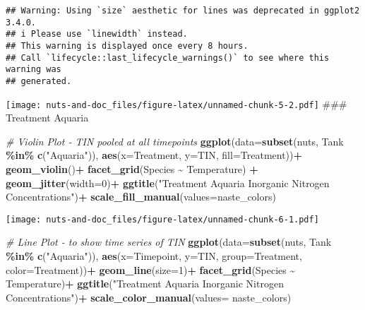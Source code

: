 \documentclass[
]{article}
\newenvironment{Shaded}{\begin{snugshade}}{\end{snugshade}}
\newcommand{\AttributeTok}[1]{\textcolor[rgb]{0.13,0.29,0.53}{#1}}
\newcommand{\CommentTok}[1]{\textcolor[rgb]{0.56,0.35,0.01}{\textit{#1}}}
\newcommand{\DecValTok}[1]{\textcolor[rgb]{0.00,0.00,0.81}{#1}}
\newcommand{\FunctionTok}[1]{\textcolor[rgb]{0.13,0.29,0.53}{\textbf{#1}}}
\newcommand{\NormalTok}[1]{#1}
\newcommand{\SpecialCharTok}[1]{\textcolor[rgb]{0.81,0.36,0.00}{\textbf{#1}}}
\newcommand{\StringTok}[1]{\textcolor[rgb]{0.31,0.60,0.02}{#1}}
\begin{document}
\begin{verbatim}
## Warning: Using `size` aesthetic for lines was deprecated in ggplot2 3.4.0.
## i Please use `linewidth` instead.
## This warning is displayed once every 8 hours.
## Call `lifecycle::last_lifecycle_warnings()` to see where this warning was
## generated.
\end{verbatim}

\texttt{[image: nuts-and-doc\_files/figure-latex/unnamed-chunk-5-2.pdf]}
\#\#\# Treatment Aquaria

\begin{Shaded}
\begin{Highlighting}[]
\CommentTok{\# Violin Plot {-} TIN pooled at all timepoints}
\FunctionTok{ggplot}\NormalTok{(}\AttributeTok{data=}\FunctionTok{subset}\NormalTok{(nuts, Tank }\SpecialCharTok{\%in\%} \FunctionTok{c}\NormalTok{(}\StringTok{"Aquaria"}\NormalTok{)), }\FunctionTok{aes}\NormalTok{(}\AttributeTok{x=}\NormalTok{Treatment, }\AttributeTok{y=}\NormalTok{TIN, }\AttributeTok{fill=}\NormalTok{Treatment))}\SpecialCharTok{+}
  \FunctionTok{geom\_violin}\NormalTok{()}\SpecialCharTok{+}
  \FunctionTok{facet\_grid}\NormalTok{(Species }\SpecialCharTok{\textasciitilde{}}\NormalTok{ Temperature) }\SpecialCharTok{+}
  \FunctionTok{geom\_jitter}\NormalTok{(}\AttributeTok{width=}\DecValTok{0}\NormalTok{)}\SpecialCharTok{+}
  \FunctionTok{ggtitle}\NormalTok{(}\StringTok{"Treatment Aquaria Inorganic Nitrogen Concentrations"}\NormalTok{)}\SpecialCharTok{+}
  \FunctionTok{scale\_fill\_manual}\NormalTok{(}\AttributeTok{values=}\NormalTok{naste\_colors)}
\end{Highlighting}
\end{Shaded}

\texttt{[image: nuts-and-doc\_files/figure-latex/unnamed-chunk-6-1.pdf]}

\begin{Shaded}
\begin{Highlighting}[]
\CommentTok{\# Line Plot {-} to show time series of TIN}
\FunctionTok{ggplot}\NormalTok{(}\AttributeTok{data=}\FunctionTok{subset}\NormalTok{(nuts, Tank }\SpecialCharTok{\%in\%} \FunctionTok{c}\NormalTok{(}\StringTok{"Aquaria"}\NormalTok{)), }\FunctionTok{aes}\NormalTok{(}\AttributeTok{x=}\NormalTok{Timepoint, }\AttributeTok{y=}\NormalTok{TIN, }\AttributeTok{group=}\NormalTok{Treatment, }\AttributeTok{color=}\NormalTok{Treatment))}\SpecialCharTok{+}
  \FunctionTok{geom\_line}\NormalTok{(}\AttributeTok{size=}\DecValTok{1}\NormalTok{)}\SpecialCharTok{+}
  \FunctionTok{facet\_grid}\NormalTok{(Species }\SpecialCharTok{\textasciitilde{}}\NormalTok{ Temperature)}\SpecialCharTok{+}
  \FunctionTok{ggtitle}\NormalTok{(}\StringTok{"Treatment Aquaria Inorganic Nitrogen Concentrations"}\NormalTok{)}\SpecialCharTok{+}
  \FunctionTok{scale\_color\_manual}\NormalTok{(}\AttributeTok{values=}\NormalTok{ naste\_colors)}
\end{Highlighting}
\end{Shaded}
\end{document}
